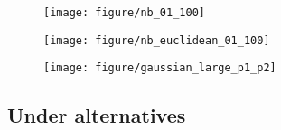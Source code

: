 \documentclass{article}
\begin{document}
\begin{figure}[ht]
  \centering
  \texttt{[image: figure/nb\_01\_100]}
  \caption{\label{fig:label} }
\end{figure}

\begin{figure}[ht]
  \centering
  \texttt{[image: figure/nb\_euclidean\_01\_100]}
  \caption{\label{fig:label} }
\end{figure}

\begin{figure}[ht]
  \centering
  \texttt{[image: figure/gaussian\_large\_p1\_p2]}
  \caption{\label{fig:label} }
\end{figure}

\subsection{Under alternatives}



\end{document}
